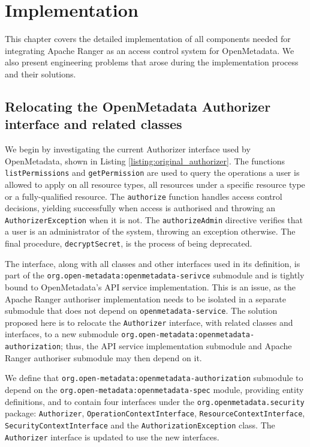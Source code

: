 \chapter{Implementation}

This chapter covers the detailed implementation of all components needed for integrating Apache Ranger as an access control system for OpenMetadata. We also present engineering problems that arose during the implementation process and their solutions.

\section{Relocating the OpenMetadata Authorizer interface and related classes}

We begin by investigating the current Authorizer interface used by OpenMetadata, shown in Listing \ref{listing:original_authorizer}. The functions \texttt{listPermissions} and \texttt{getPermission} are used to query the operations a user is allowed to apply on all resource types, all resources under a specific resource type or a fully-qualified resource. The \texttt{authorize} function handles access control decisions, yielding successfully when access is authorised and throwing an \texttt{AuthorizerException} when it is not. The \texttt{authorizeAdmin} directive verifies that a user is an administrator of the system, throwing an exception otherwise. The final procedure, \texttt{decryptSecret}, is the process of being deprecated. 

The interface, along with all classes and other interfaces used in its definition, is part of the \texttt{org.open-metadata:openmetadata-serivce} submodule and is tightly bound to OpenMetadata's API service implementation. This is an issue, as the Apache Ranger authoriser implementation needs to be isolated in a separate submodule that does not depend on \texttt{openmetadata-service}. The solution proposed here is to relocate the \texttt{Authorizer} interface, with related classes and interfaces, to a new submodule \texttt{org.open-metadata:openmetadata-authorization}; thus, the API service implementation submodule and Apache Ranger authoriser submodule may then depend on it.

We define that \texttt{org.open-metadata:openmetadata-authorization} submodule to depend on the \texttt{org.open-metadata:openmetadata-spec} module, providing entity definitions, and to contain four interfaces under the \texttt{org.openmetadata.security} package: \texttt{Authorizer}, \texttt{OperationContextInterface}, \texttt{ResourceContextInterface}, \texttt{SecurityContextInterface} and the \texttt{AuthorizationException} class. The \texttt{Authorizer} interface is updated to use the new interfaces.

